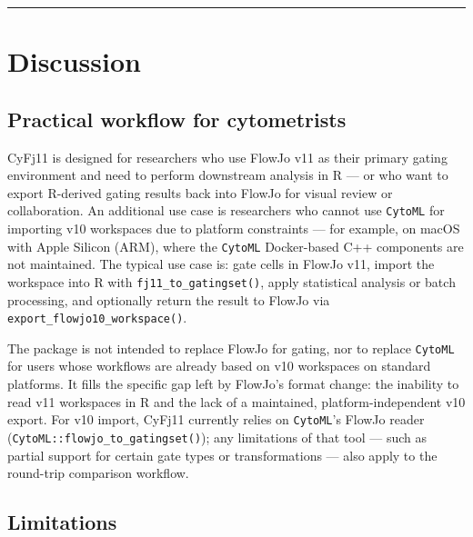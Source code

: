 \documentclass[
]{article}
\begin{document}
\begin{center}\rule{0.5\linewidth}{0.5pt}\end{center}

\section{Discussion}\label{discussion}

\subsection{Practical workflow for
cytometrists}\label{practical-workflow-for-cytometrists}

CyFj11 is designed for researchers who use FlowJo v11 as their primary
gating environment and need to perform downstream analysis in R --- or
who want to export R-derived gating results back into FlowJo for visual
review or collaboration. An additional use case is researchers who
cannot use \texttt{CytoML} for importing v10 workspaces due to platform
constraints --- for example, on macOS with Apple Silicon (ARM), where
the \texttt{CytoML} Docker-based C++ components are not maintained. The
typical use case is: gate cells in FlowJo v11, import the workspace into
R with \texttt{fj11\_to\_gatingset()}, apply statistical analysis or
batch processing, and optionally return the result to FlowJo via
\texttt{export\_flowjo10\_workspace()}.

The package is not intended to replace FlowJo for gating, nor to replace
\texttt{CytoML} for users whose workflows are already based on v10
workspaces on standard platforms. It fills the specific gap left by
FlowJo's format change: the inability to read v11 workspaces in R and
the lack of a maintained, platform-independent v10 export. For v10
import, CyFj11 currently relies on \texttt{CytoML}'s FlowJo reader
(\texttt{CytoML::flowjo\_to\_gatingset()}); any limitations of that tool
--- such as partial support for certain gate types or transformations
--- also apply to the round-trip comparison workflow.

\subsection{Limitations}\label{limitations}
\end{document}
